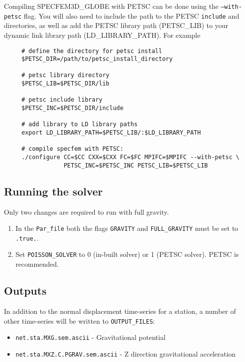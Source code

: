  Compiling SPECFEM3D\_GLOBE with PETSC can be done using the \texttt{--with-petsc} flag. You will also need to include the 
 path to the PETSC \texttt{include} and  directories, as well as add the PETSC library path (PETSC\_LIB) to your
 dynamic link library path (LD\_LIBRARY\_PATH). For example 
 \begin{verbatim}
     # define the directory for petsc install 
     $PETSC_DIR=/path/to/petsc_install_directory
 
     # petsc library directory
     $PETSC_LIB=$PETSC_DIR/lib
 
     # petsc include library 
     $PETSC_INC=$PETSC_DIR/include
 
     # add library to LD library paths 
     export LD_LIBRARY_PATH=$PETSC_LIB/:$LD_LIBRARY_PATH
 
     # compile specfem with PETSC: 
     ./configure CC=$CC CXX=$CXX FC=$FC MPIFC=$MPIFC --with-petsc \ 
                 PETSC_INC=$PETSC_INC PETSC_LIB=$PETSC_LIB
 \end{verbatim}
 
 
 \subsection{Running the solver}
 Only two changes are required to run with full gravity. 
 \begin{enumerate}
   \item In the \texttt{Par\_file} both the flags \texttt{GRAVITY} and \texttt{FULL\_GRAVITY} must be set to \texttt{.true.}.   
   \item Set \texttt{POISSON\_SOLVER} to 0 (in-built solver) or 1 (PETSC solver). PETSC is recommended. 
 \end{enumerate}    
 
 
 \subsection{Outputs}
 In addition to the normal displacement time-series for a station, a number of other time-series will be written to 
 \texttt{OUTPUT\_FILES}: 
 
 \begin{itemize}
     \item \texttt{net.sta.MXG.sem.ascii} - Gravitational potential 
     \item \texttt{net.sta.MXZ.C.PGRAV.sem.ascii} - Z direction gravitational acceleration 
 \end{itemize} 
 

